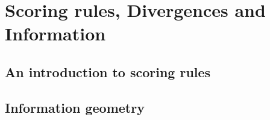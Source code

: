 \part{Scoring rules, Divergences and Information}

\chapter{An introduction to scoring rules\label{sec:scoring_rules}}


\chapter{Information geometry\label{sec:embeddings}}


% 